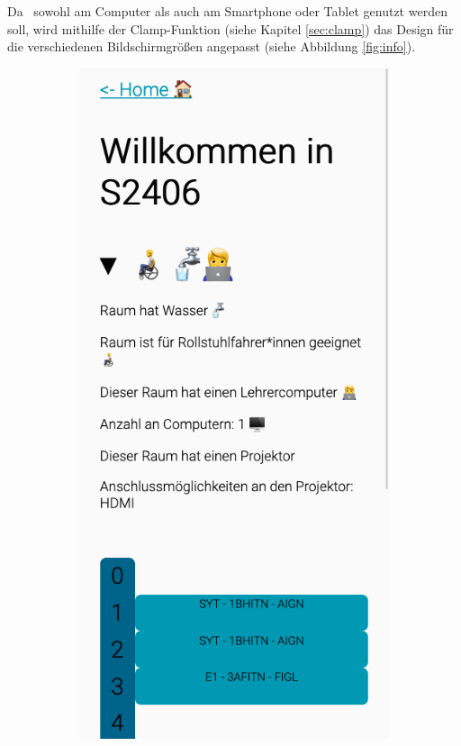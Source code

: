 
\clearpage
{}

Da \ZELIA\ sowohl am Computer als auch am Smartphone oder Tablet genutzt werden soll, wird mithilfe der Clamp-Funktion (siehe Kapitel \ref{sec:clamp}) das Design für die verschiedenen Bildschirmgrößen angepasst (siehe Abbildung \ref{fig:info}).

\begin{figure}[H]
    \begin{subfigure}[b]{0.34\textwidth}
        \centering
        \includegraphics[width=\textwidth]{media/ResponsiveDesign/ZeliaMobile.png}

\end{subfigure}
\end{figure}
